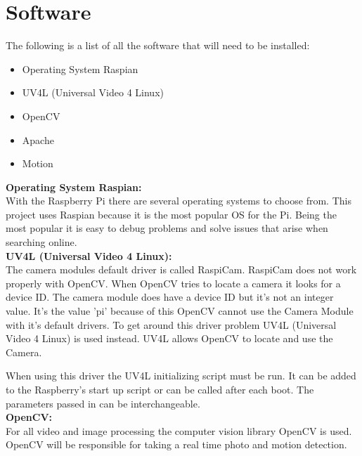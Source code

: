 \documentclass[]{report}
\begin{document}
\section {Software}	
\label {sec:software}	
The following is a list of all the software that will need to be installed:
\begin {itemize}
  \item Operating System Raspian \\
  \item UV4L (Universal Video 4 Linux)\\  
  \item OpenCV\\
  \item Apache\\
  \item Motion\\
\end {itemize}

\noindent
{\bf Operating System Raspian:}\\
\break
With the Raspberry Pi there are several operating systems to choose from. This project uses Raspian because it is the most popular OS for the Pi. Being the most popular it is easy to debug problems and solve issues that arise when searching online.\\ 

\noindent
{\bf UV4L (Universal Video 4 Linux):}\\
\break
The camera modules default driver is called RaspiCam. RaspiCam does not work properly with OpenCV. When OpenCV tries to locate a camera it looks for a device ID. The camera module does have a device ID but it's not an integer value. It's the value 'pi' because of this OpenCV cannot use the Camera Module with it's default drivers. To get around this driver problem UV4L (Universal Video 4 Linux) is used instead. UV4L allows OpenCV to locate and use the Camera.

When using this driver the UV4L initializing script must be run. It can be added to the Raspberry's start up script or can be called after each boot. The parameters passed in can be interchangeable.\\

\noindent
{\bf OpenCV:}\\
\break
For all video and image processing the computer vision library OpenCV is used.\\

OpenCV will be responsible for taking a real time photo and motion detection.\\
\end{document}
